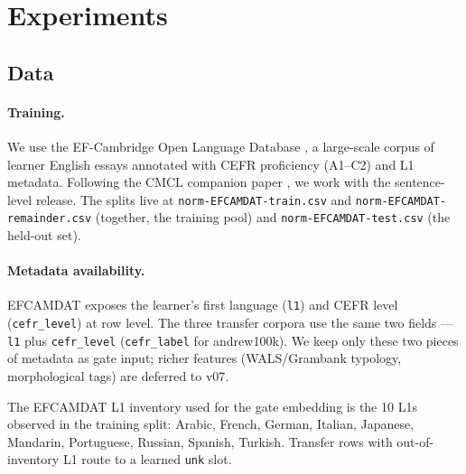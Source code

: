 \section{Experiments}
\label{sec:experiments}

\subsection{Data}
\label{subsec:data}

\paragraph{Training.}
We use the EF-Cambridge Open Language Database
\citep{geertzen2014efcamdat}, a large-scale corpus of learner English
essays annotated with CEFR proficiency (A1--C2) and L1 metadata.
Following the CMCL companion paper \citep{stearns2026artificial}, we
work with the sentence-level release. The splits live at
\texttt{norm-EFCAMDAT-train.csv} and \texttt{norm-EFCAMDAT-remainder.csv}
(together, the training pool) and \texttt{norm-EFCAMDAT-test.csv} (the
held-out set).

\paragraph{Metadata availability.}
EFCAMDAT exposes the learner's first language (\texttt{l1}) and CEFR
level (\texttt{cefr\_level}) at row level. The three transfer corpora
use the same two fields --- \texttt{l1} plus \texttt{cefr\_level}
(\texttt{cefr\_label} for andrew100k). We keep only these two
pieces of metadata as gate input; richer features (WALS/Grambank
typology, morphological tags) are deferred to v07.

The EFCAMDAT L1 inventory used for the gate embedding is the 10 L1s
observed in the training split: Arabic, French, German, Italian,
Japanese, Mandarin, Portuguese, Russian, Spanish, Turkish. Transfer
rows with out-of-inventory L1 route to a learned \texttt{unk} slot.

